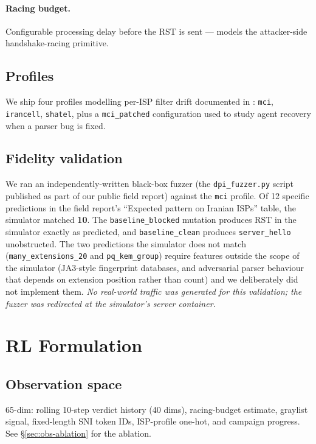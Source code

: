\documentclass[letterpaper,twocolumn,10pt]{article}
\begin{document}
\paragraph{Racing budget.} Configurable processing delay before the RST
is sent — models the attacker-side handshake-racing primitive.

\subsection{Profiles}
We ship four profiles modelling per-ISP filter drift documented in
\cite{aryapour2025}: \texttt{mci}, \texttt{irancell}, \texttt{shatel},
plus a \texttt{mci\_patched} configuration used to study agent recovery
when a parser bug is fixed.

\subsection{Fidelity validation}
\label{sec:fidelity}
We ran an independently-written black-box fuzzer (the
\texttt{dpi\_fuzzer.py} script published as part of our public field
report) against the \texttt{mci} profile.  Of 12 specific predictions in
the field report's ``Expected pattern on Iranian ISPs'' table, the
simulator matched \textbf{10}.  The \texttt{baseline\_blocked} mutation
produces RST in the simulator exactly as predicted, and
\texttt{baseline\_clean} produces \texttt{server\_hello} unobstructed.
The two predictions the simulator does not match
(\texttt{many\_extensions\_20} and \texttt{pq\_kem\_group}) require
features outside the scope of the simulator (JA3-style fingerprint
databases, and adversarial parser behaviour that depends on extension
position rather than count) and we deliberately did not implement them.
\emph{No real-world traffic was generated for this validation; the
fuzzer was redirected at the simulator's server container.}

\section{RL Formulation}
\label{sec:rl}

\subsection{Observation space}
65-dim: rolling 10-step verdict history (40 dims), racing-budget
estimate, graylist signal, fixed-length SNI token IDs, ISP-profile
one-hot, and campaign progress. See \S\ref{sec:obs-ablation} for the
ablation.
\end{document}
